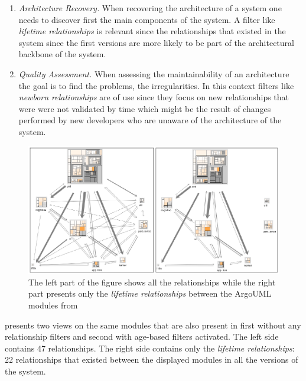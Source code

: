 \documentclass[preprint,12pt]{elsarticle}
\begin{document}
\begin{enumerate}

\item {\em Architecture Recovery.} When recovering the architecture of a system one needs to discover first the main components of the system. A filter like {\em lifetime relationships} is relevant since the relationships that existed in the system since the first versions are more likely to be part of the architectural backbone of the system. %

\item {\em Quality Assessment.} When assessing the maintainability of an architecture the goal is to find the problems, the irregularities. In this context filters like {\em newborn relationships} are of use since they focus on new relationships that were were not validated by time which might be the result of changes performed by new developers who are unaware of the architecture of the system. %

\end{enumerate}
\begin{figure}
\begin{center}
\includegraphics[width=\linewidth]{Architecture-LifetimeVsRecent}
\caption{The left part of the figure shows all the relationships while the right part presents only the {\em lifetime relationships} between the ArgoUML modules from }
\end{center}
\end{figure}


 presents two views on the same modules that are also present in  first without any relationship filters and second with age-based filters activated. The left side contains 47 relationships. The right side contains only the {\em lifetime relationships}: 22 relationships that existed between the displayed modules in all the versions of the system. 
\end{document}
